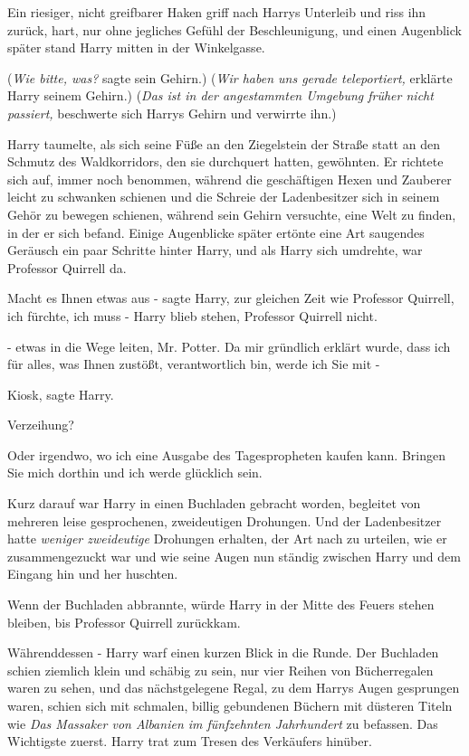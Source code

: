 Ein riesiger, nicht greifbarer Haken griff nach Harrys Unterleib und riss ihn
zurück, hart, nur ohne jegliches Gefühl der Beschleunigung, und einen Augenblick
später stand Harry mitten in der Winkelgasse.

(\emph{Wie bitte, was?} sagte sein Gehirn.) (\emph{Wir haben uns gerade
teleportiert,} erklärte Harry seinem Gehirn.) (\emph{Das ist in der angestammten
Umgebung früher nicht passiert,} beschwerte sich Harrys Gehirn und verwirrte
ihn.)

Harry taumelte, als sich seine Füße an den Ziegelstein der Straße statt an den
Schmutz des Waldkorridors, den sie durchquert hatten, gewöhnten. Er richtete
sich auf, immer noch benommen, während die geschäftigen Hexen und Zauberer
leicht zu schwanken schienen und die Schreie der Ladenbesitzer sich in seinem
Gehör zu bewegen schienen, während sein Gehirn versuchte, eine Welt zu finden,
in der er sich befand. Einige Augenblicke später ertönte eine Art saugendes
Geräusch ein paar Schritte hinter Harry, und als Harry sich umdrehte, war
Professor Quirrell da.

\glqq{}Macht es Ihnen etwas aus -\grqq{} sagte Harry, zur gleichen Zeit wie
Professor Quirrell, \glqq{}ich fürchte, ich muss -\grqq{} Harry blieb stehen,
Professor Quirrell nicht.

\glqq{}- etwas in die Wege leiten, Mr. Potter. Da mir gründlich erklärt wurde,
dass ich für alles, was Ihnen zustößt, verantwortlich bin, werde ich Sie mit
-\grqq{}

\glqq{}Kiosk\grqq{}, sagte Harry.

\glqq{}Verzeihung?\grqq{}

\glqq{}Oder irgendwo, wo ich eine Ausgabe des Tagespropheten kaufen kann. Bringen
Sie mich dorthin und ich werde glücklich sein.\grqq{}

Kurz darauf war Harry in einen Buchladen gebracht worden, begleitet von mehreren
leise gesprochenen, zweideutigen Drohungen. Und der Ladenbesitzer hatte
\emph{weniger zweideutige} Drohungen erhalten, der Art nach zu urteilen, wie er
zusammengezuckt war und wie seine Augen nun ständig zwischen Harry und dem
Eingang hin und her huschten.

Wenn der Buchladen abbrannte, würde Harry in der Mitte des Feuers stehen
bleiben, bis Professor Quirrell zurückkam.

Währenddessen - Harry warf einen kurzen Blick in die Runde. Der Buchladen schien
ziemlich klein und schäbig zu sein, nur vier Reihen von Bücherregalen waren zu
sehen, und das nächstgelegene Regal, zu dem Harrys Augen gesprungen waren,
schien sich mit schmalen, billig gebundenen Büchern mit düsteren Titeln wie
\emph{Das Massaker von Albanien im fünfzehnten Jahrhundert} zu befassen. Das
Wichtigste zuerst. Harry trat zum Tresen des Verkäufers hinüber.

